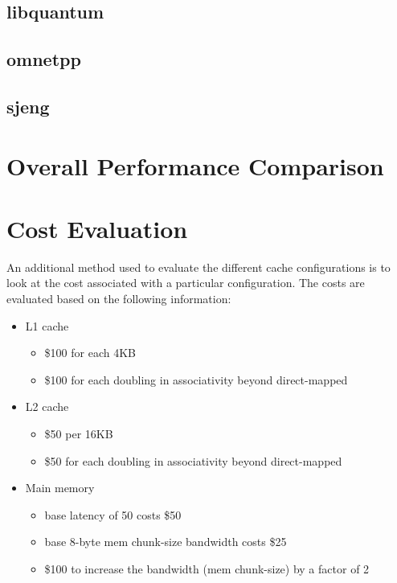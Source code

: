 \documentclass[11pt,titlepage]{article}
\begin{document}
    \subsection{libquantum}

    \subsection{omnetpp}

    \subsection{sjeng}

\section{Overall Performance Comparison}

\section{Cost Evaluation}
    An additional method used to evaluate the different cache configurations is to look at the cost associated with a particular configuration. The costs are evaluated based on the following information:
    \begin{itemize}
        \item L1 cache
            \begin{itemize}
                \item \$100 for each 4KB
                \item \$100 for each doubling in associativity beyond direct-mapped
            \end{itemize}
        \item L2 cache
            \begin{itemize}
                \item \$50 per 16KB
                \item \$50 for each doubling in associativity beyond direct-mapped
            \end{itemize}
        \item Main memory
            \begin{itemize}
                \item base latency of 50 costs \$50
                \item base 8-byte mem chunk-size bandwidth costs \$25
                \item \$100 to increase the bandwidth (mem chunk-size) by a factor of 2
            \end{itemize}
    \end{itemize}
\end{document}
